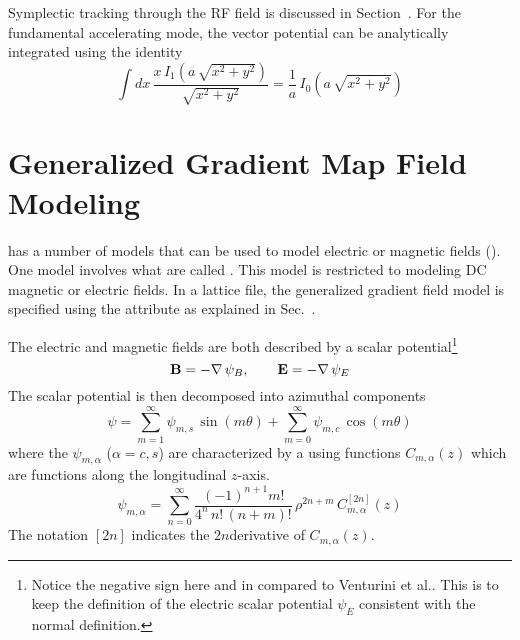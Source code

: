 Symplectic tracking through the RF field is discussed in Section~.  For the
fundamental accelerating mode, the vector potential can be analytically integrated using the
identity
\begin{equation}
  \int dx \,\frac{x \, I_1 (a \, \sqrt{x^2+y^2})}{\sqrt{x^2+y^2}}  = 
  \frac{1}{a} \, I_0 (a \, \sqrt{x^2+y^2})
\end{equation}

\section{Generalized Gradient Map Field Modeling}
\label{s:gen.grad.phys}

\bmad has a number of  models that can be used to model electric or magnetic fields
(). One model involves what are called \cite{b:gen.grad}.
This model is restricted to modeling DC magnetic or electric fields. In a lattice file, the
generalized gradient field model is specified using the  attribute as explained
in Sec.~.

The electric and magnetic fields are both described by a scalar potential\footnote
  {
Notice the negative sign here and in  compared to Venturini et al.\cite{b:gen.grad}. This
is to keep the definition of the electric scalar potential $\psi_E$ consistent with the normal
definition.
  }
\begin{equation}
  {\bf B} = -\nabla \, \psi_B, \qquad {\bf E} = -\nabla \, \psi_E
  \label{bpep2}
\end{equation}
The scalar potential is then decomposed into azimuthal components
\begin{equation}
  \psi = \sum_{m = 1}^\infty \psi_{m,s} \, \sin(m \theta) + \sum_{m = 0}^\infty \psi_{m,c} \, \cos(m \theta)
\end{equation}
where the $\psi_{m,\alpha}$ ($\alpha = c,s$) are characterized by a using functions
$C_{m,\alpha}(z)$ which are functions along the longitudinal $z$-axis.
\begin{equation}
  \psi_{m,\alpha} = \sum_{n = 0}^\infty \frac{(-1)^{n+1} m!}{4^n \, n! \, (n+m)!} 
  \, \rho^{2n+m} \, C_{m,\alpha}^{[2n]}(z) 
  \label{ppmpp}
\end{equation}
The notation $[2n]$ indicates the $2n$\Th derivative of $C_{m,\alpha}(z)$.

